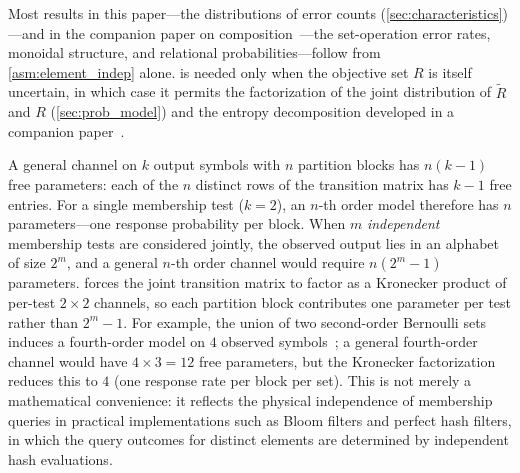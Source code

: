 \begin{remark}
\label{rem:axiom_economy}
Most results in this paper---the distributions of error counts (\cref{sec:characteristics})---and in the companion paper on composition~\cite{bernoulliComposition}---the set-operation error rates, monoidal structure, and relational probabilities---follow from \cref{asm:element_indep} alone.
 is needed only when the objective set $R$ is itself uncertain, in which case it permits the factorization of the joint distribution of $\tilde{R}$ and $R$ (\cref{sec:prob_model}) and the entropy decomposition developed in a companion paper~\cite{bernoulliEntropy}.
\end{remark}

\begin{remark}
\label{rem:parametric_parsimony}
A general channel on $k$ output symbols with $n$ partition blocks has $n(k-1)$ free parameters: each of the $n$ distinct rows of the transition matrix has $k - 1$ free entries.
For a single membership test ($k = 2$), an $n$-th order model therefore has $n$ parameters---one response probability per block.
When $m$ \emph{independent} membership tests are considered jointly, the observed output lies in an alphabet of size $2^m$, and a general $n$-th order channel would require $n(2^m - 1)$ parameters.
 forces the joint transition matrix to factor as a Kronecker product of per-test $2 \times 2$ channels, so each partition block contributes one parameter per test rather than $2^m - 1$.
For example, the union of two second-order Bernoulli sets induces a fourth-order model on $4$ observed symbols~\cite{bernoulliComposition}; a general fourth-order channel would have $4 \times 3 = 12$ free parameters, but the Kronecker factorization reduces this to $4$ (one response rate per block per set).
This is not merely a mathematical convenience: it reflects the physical independence of membership queries in practical implementations such as Bloom filters and perfect hash filters, in which the query outcomes for distinct elements are determined by independent hash evaluations.
\end{remark}

